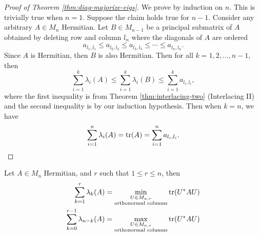 \begin{proof}[Proof of Theorem \ref{thm:diag-majorize-eigs}]
We prove by induction on $n$. This is trivially true when $n = 1$. Suppose the claim holds true for $n-1$. Consider any arbitrary $A \in M_n$ Hermitian. Let $B \in M_{n-1}$ be a principal submatrix of $A$ obtained by deleting row and column $l_n$ where the diagonals of $A$ are ordered
$$
a_{l_1, l_1} \leq a_{l_2, l_2} \leq a_{l_3, l_3} \leq \cdots \leq a_{l_n, l_n}.
$$
Since $A$ is Hermitian, then $B$ is also Hermitian. Then for all $k = 1, 2, \dots, n-1$, then
$$
\sum_{i=1}^k \lambda_i(A) \leq \sum_{i=1}^k \lambda_i(B) \leq \sum_{i=1}^k a_{l_i, l_i},
$$
where the first inequality is from Theorem \ref{thm:interlacing-two} (Interlacing II) and the second inequality is by our induction hypothesis. Then when $k = n$, we have
$$
\sum_{i=1}^n \lambda_i(A) = \operatorname{tr}(A) = \sum_{i=1}^n a_{l_i, l_i}.
$$
\end{proof}

\begin{theorem}
\label{thm:hermitian-trace-orthonormal-cols}
Let $A \in M_n$ Hermitian, and $r$ such that $1 \leq r \leq n$, then
\begin{align*}
    \sum_{k=1}^r \lambda_k(A) &= \min_{\substack{U \in M_{n,r} \\ \text{orthonormal columns}}} \operatorname{tr}(U^*AU) \\
    \sum_{k=0}^{r-1} \lambda_{n-k}(A) &= \max_{\substack{U \in M_{n,r} \\ \text{orthonormal columns}}} \operatorname{tr}(U^*AU) \\
\end{align*}
\end{theorem}


